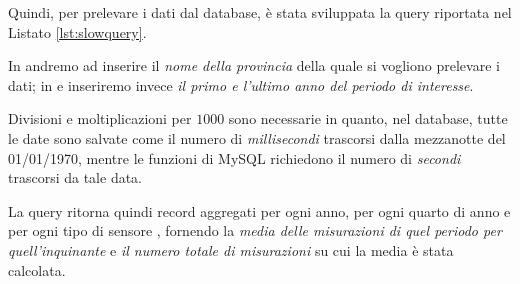 Quindi, per prelevare i dati dal database, è stata sviluppata la query riportata
nel Listato \ref{lst:slowquery}.



In  andremo ad inserire il \emph{nome della
provincia} della quale si vogliono prelevare i dati; in
 e  inseriremo invece \emph{il
primo e l'ultimo anno del periodo di interesse}.

Divisioni e moltiplicazioni per \(1000\) sono necessarie in quanto, nel
database, tutte le date sono salvate come il numero di \emph{millisecondi}
trascorsi dalla mezzanotte del 01/01/1970, mentre le funzioni di MySQL
richiedono il numero di \emph{secondi} trascorsi da tale data.

La query ritorna quindi record aggregati per ogni anno, per ogni quarto di anno
e per ogni tipo di sensore , fornendo la \emph{media delle
misurazioni di quel periodo per quell'inquinante} e \emph{il numero totale di
misurazioni} su cui la media è stata calcolata.
